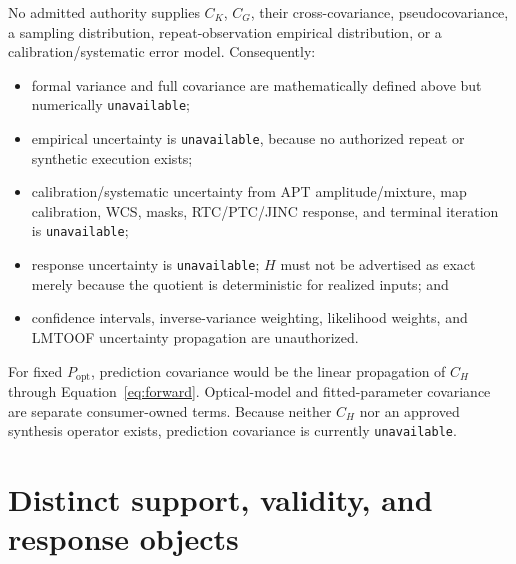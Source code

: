 \documentclass[11pt]{article}
\newcommand{\NA}{\texttt{unavailable}}
\begin{document}
No admitted authority supplies $C_K$, $C_G$, their cross-covariance,
pseudocovariance, a sampling distribution, repeat-observation empirical
distribution, or a calibration/systematic error model.  Consequently:
\begin{itemize}
\item formal variance and full covariance are mathematically defined above but
numerically \NA;
\item empirical uncertainty is \NA, because no authorized repeat or synthetic
execution exists;
\item calibration/systematic uncertainty from APT amplitude/mixture, map
calibration, WCS, masks, RTC/PTC/JINC response, and terminal iteration is
\NA;
\item response uncertainty is \NA; $H$ must not be advertised as exact merely
because the quotient is deterministic for realized inputs; and
\item confidence intervals, inverse-variance weighting, likelihood weights,
and LMTOOF uncertainty propagation are unauthorized.
\end{itemize}

For fixed $P_{\mathrm{opt}}$, prediction covariance would be the linear
propagation of $C_H$ through Equation~\ref{eq:forward}.  Optical-model and
fitted-parameter covariance are separate consumer-owned terms.  Because neither
$C_H$ nor an approved synthesis operator exists, prediction covariance is
currently \NA.

\section{Distinct support, validity, and response objects}
\end{document}
